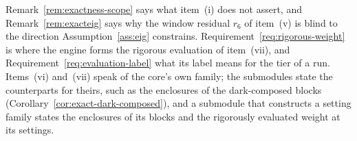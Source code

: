 
Remark~\ref{rem:exactness-scope} says what item~(i) does not assert, and
Remark~\ref{rem:exacteig} says why the window residual $r_6$ of item~(v) is
blind to the direction Assumption~\ref{ass:eig} constrains.
Requirement~\ref{req:rigorous-weight} is where the engine forms the rigorous
evaluation of item~(vii), and Requirement~\ref{req:evaluation-label} what its
label means for the tier of a run. Items~(vi) and~(vii) speak of the core's
own family; the submodules state the counterparts for theirs, such as the
enclosures of the dark-composed blocks
(Corollary~\ref{cor:exact-dark-composed}), and a submodule that constructs a
setting family states the enclosures of its blocks and the rigorously
evaluated weight at its settings.

